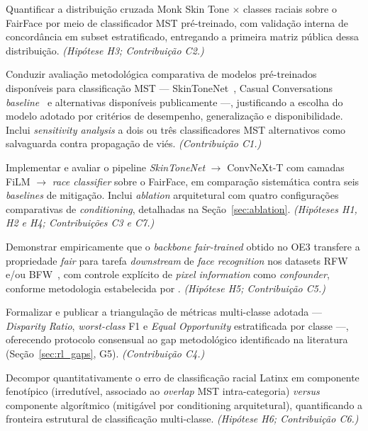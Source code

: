 \begin{description}[font=\bfseries\sffamily]
\item[OE1.] Quantificar a distribuição cruzada Monk Skin Tone $\times$ classes raciais sobre o FairFace por meio de classificador MST pré-treinado, com validação interna de concordância em subset estratificado, entregando a primeira matriz pública dessa distribuição. \textit{(Hipótese H3; Contribuição C2.)}

\item[OE2.] Conduzir avaliação metodológica comparativa de modelos pré-treinados disponíveis para classificação MST --- SkinToneNet~\autocite{matias2026large}, Casual Conversations \emph{baseline}~\autocite{hazirbas2021towards,porgali2023casual} e alternativas disponíveis publicamente ---, justificando a escolha do modelo adotado por critérios de desempenho, generalização e disponibilidade. Inclui \emph{sensitivity analysis} a dois ou três classificadores MST alternativos como salvaguarda contra propagação de viés. \textit{(Contribuição C1.)}

\item[OE3.] Implementar e avaliar o pipeline \emph{SkinToneNet} $\rightarrow$ ConvNeXt-T com camadas FiLM $\rightarrow$ \emph{race classifier} sobre o FairFace, em comparação sistemática contra seis \emph{baselines} de mitigação. Inclui \emph{ablation} arquitetural com quatro configurações comparativas de \emph{conditioning}, detalhadas na Seção~\ref{sec:ablation}. \textit{(Hipóteses H1, H2 e H4; Contribuições C3 e C7.)}

\item[OE4.] Demonstrar empiricamente que o \emph{backbone} \emph{fair-trained} obtido no OE3 transfere a propriedade \emph{fair} para tarefa \emph{downstream} de \emph{face recognition} nos datasets RFW~\autocite{wang2019racial} e/ou BFW~\autocite{robinson2020face}, com controle explícito de \emph{pixel information} como \emph{confounder}, conforme metodologia estabelecida por \textcite{pangelinan2023exploring}. \textit{(Hipótese H5; Contribuição C5.)}

\item[OE5.] Formalizar e publicar a triangulação de métricas multi-classe adotada --- \emph{Disparity Ratio}, \emph{worst-class} F1 e \emph{Equal Opportunity} estratificada por classe ---, oferecendo protocolo consensual ao gap metodológico identificado na literatura (Seção~\ref{sec:rl_gaps}, G5). \textit{(Contribuição C4.)}

\item[OE6.] Decompor quantitativamente o erro de classificação racial Latinx em componente fenotípico (irredutível, associado ao \emph{overlap} MST intra-categoria) \emph{versus} componente algorítmico (mitigável por conditioning arquitetural), quantificando a fronteira estrutural de classificação multi-classe. \textit{(Hipótese H6; Contribuição C6.)}
\end{description}

